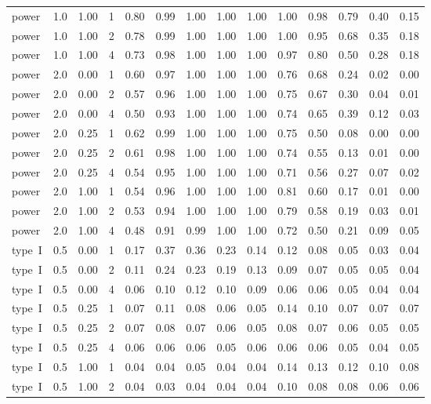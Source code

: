 \begin{table}[H]
\begin{tabular}{lrrrrrrrrrrrrr}
power & 1.0 & 1.00 & 1 & 0.80 & 0.99 & 1.00 & 1.00 & 1.00 & 1.00 & 0.98 & 0.79 & 0.40 & 0.15\\
power & 1.0 & 1.00 & 2 & 0.78 & 0.99 & 1.00 & 1.00 & 1.00 & 1.00 & 0.95 & 0.68 & 0.35 & 0.18\\
power & 1.0 & 1.00 & 4 & 0.73 & 0.98 & 1.00 & 1.00 & 1.00 & 0.97 & 0.80 & 0.50 & 0.28 & 0.18\\
power & 2.0 & 0.00 & 1 & 0.60 & 0.97 & 1.00 & 1.00 & 1.00 & 0.76 & 0.68 & 0.24 & 0.02 & 0.00\\
power & 2.0 & 0.00 & 2 & 0.57 & 0.96 & 1.00 & 1.00 & 1.00 & 0.75 & 0.67 & 0.30 & 0.04 & 0.01\\
power & 2.0 & 0.00 & 4 & 0.50 & 0.93 & 1.00 & 1.00 & 1.00 & 0.74 & 0.65 & 0.39 & 0.12 & 0.03\\
power & 2.0 & 0.25 & 1 & 0.62 & 0.99 & 1.00 & 1.00 & 1.00 & 0.75 & 0.50 & 0.08 & 0.00 & 0.00\\
power & 2.0 & 0.25 & 2 & 0.61 & 0.98 & 1.00 & 1.00 & 1.00 & 0.74 & 0.55 & 0.13 & 0.01 & 0.00\\
power & 2.0 & 0.25 & 4 & 0.54 & 0.95 & 1.00 & 1.00 & 1.00 & 0.71 & 0.56 & 0.27 & 0.07 & 0.02\\
power & 2.0 & 1.00 & 1 & 0.54 & 0.96 & 1.00 & 1.00 & 1.00 & 0.81 & 0.60 & 0.17 & 0.01 & 0.00\\
power & 2.0 & 1.00 & 2 & 0.53 & 0.94 & 1.00 & 1.00 & 1.00 & 0.79 & 0.58 & 0.19 & 0.03 & 0.01\\
power & 2.0 & 1.00 & 4 & 0.48 & 0.91 & 0.99 & 1.00 & 1.00 & 0.72 & 0.50 & 0.21 & 0.09 & 0.05\\
type~I & 0.5 & 0.00 & 1 & 0.17 & 0.37 & 0.36 & 0.23 & 0.14 & 0.12 & 0.08 & 0.05 & 0.03 & 0.04\\
type~I & 0.5 & 0.00 & 2 & 0.11 & 0.24 & 0.23 & 0.19 & 0.13 & 0.09 & 0.07 & 0.05 & 0.05 & 0.04\\
type~I & 0.5 & 0.00 & 4 & 0.06 & 0.10 & 0.12 & 0.10 & 0.09 & 0.06 & 0.06 & 0.05 & 0.04 & 0.04\\
type~I & 0.5 & 0.25 & 1 & 0.07 & 0.11 & 0.08 & 0.06 & 0.05 & 0.14 & 0.10 & 0.07 & 0.07 & 0.07\\
type~I & 0.5 & 0.25 & 2 & 0.07 & 0.08 & 0.07 & 0.06 & 0.05 & 0.08 & 0.07 & 0.06 & 0.05 & 0.05\\
type~I & 0.5 & 0.25 & 4 & 0.06 & 0.06 & 0.06 & 0.05 & 0.06 & 0.06 & 0.06 & 0.05 & 0.04 & 0.05\\
type~I & 0.5 & 1.00 & 1 & 0.04 & 0.04 & 0.05 & 0.04 & 0.04 & 0.14 & 0.13 & 0.12 & 0.10 & 0.08\\
type~I & 0.5 & 1.00 & 2 & 0.04 & 0.03 & 0.04 & 0.04 & 0.04 & 0.10 & 0.08 & 0.08 & 0.06 & 0.06\\

\end{tabular}
\end{table}
